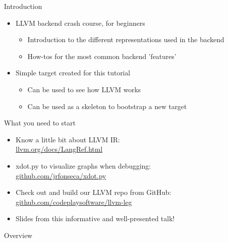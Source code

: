 \documentclass[t]{beamer}
\begin{document}

\begin{frame}{Introduction}

\begin{itemize}
    \item LLVM backend crash course, for beginners
    \begin{itemize}
        \item Introduction to the different representations used in the backend
        \item How-tos for the most common backend 'features'
    \end{itemize}  
    \item Simple target created for this tutorial
    \begin{itemize}
        \item Can be used to see how LLVM works
        \item Can be used as a skeleton to bootstrap a new target
    \end{itemize}
\end{itemize}

\end{frame}


\begin{frame}{What you need to start}

\begin{itemize}
    \item Know a little bit about LLVM IR: \\ \url{llvm.org/docs/LangRef.html}
    \item xdot.py to visualize graphs when debugging: \\ \url{github.com/jrfonseca/xdot.py}
    \item Check out and build our LLVM repo from GitHub: \\ \url{github.com/codeplaysoftware/llvm-leg}
    \item Slides from this informative and well-presented talk!
\end{itemize}

\end{frame}


\begin{frame}{Overview}
\tableofcontents
\end{frame}
\end{document}

